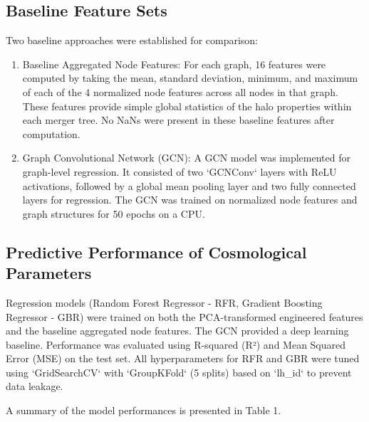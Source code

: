 \documentclass[twocolumn]{aastex631}
\begin{document}
\subsection{Baseline Feature Sets}

Two baseline approaches were established for comparison:
\begin{enumerate}
    \item Baseline Aggregated Node Features: For each graph, 16 features were computed by taking the mean, standard deviation, minimum, and maximum of each of the 4 normalized node features across all nodes in that graph. These features provide simple global statistics of the halo properties within each merger tree. No NaNs were present in these baseline features after computation.
    \item Graph Convolutional Network (GCN): A GCN model was implemented for graph-level regression. It consisted of two `GCNConv` layers with ReLU activations, followed by a global mean pooling layer and two fully connected layers for regression. The GCN was trained on normalized node features and graph structures for 50 epochs on a CPU.
\end{enumerate}

\subsection{Predictive Performance of Cosmological Parameters}

Regression models (Random Forest Regressor - RFR, Gradient Boosting Regressor - GBR) were trained on both the PCA-transformed engineered features and the baseline aggregated node features. The GCN provided a deep learning baseline. Performance was evaluated using R-squared (R²) and Mean Squared Error (MSE) on the test set. All hyperparameters for RFR and GBR were tuned using `GridSearchCV` with `GroupKFold` (5 splits) based on `lh_id` to prevent data leakage.

A summary of the model performances is presented in Table 1.
\end{document}
